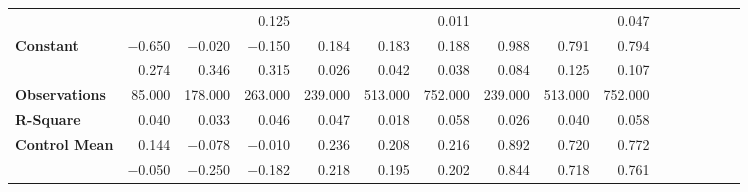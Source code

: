 \begin{tabular}{@{\extracolsep{5pt}}lrrrrrrrrrrrrrrr}
{\bf } & \phantom{***} & \phantom{***} & 0.125\phantom{\phantom{)}***} & \phantom{***} & \phantom{***} & 0.011\phantom{\phantom{)}***} & \phantom{***} & \phantom{***} & 0.047\phantom{\phantom{)}***} \\
{\bf Constant} & $-$0.650\phantom{\phantom{)}***} & $-$0.020\phantom{\phantom{)}***} & $-$0.150\phantom{\phantom{)}***} & 0.184\phantom{\phantom{)}***} & 0.183\phantom{\phantom{)}***} & 0.188\phantom{\phantom{)}***} & 0.988\phantom{\phantom{)}***} & 0.791\phantom{\phantom{)}***} & 0.794\phantom{\phantom{)}***} \\
{\bf } & 0.274\phantom{\phantom{)}***} & 0.346\phantom{\phantom{)}***} & 0.315\phantom{\phantom{)}***} & 0.026\phantom{\phantom{)}***} & 0.042\phantom{\phantom{)}***} & 0.038\phantom{\phantom{)}***} & 0.084\phantom{\phantom{)}***} & 0.125\phantom{\phantom{)}***} & 0.107\phantom{\phantom{)}***} \\
{\bf Observations} & 85.000\phantom{\phantom{)}***} & 178.000\phantom{\phantom{)}***} & 263.000\phantom{\phantom{)}***} & 239.000\phantom{\phantom{)}***} & 513.000\phantom{\phantom{)}***} & 752.000\phantom{\phantom{)}***} & 239.000\phantom{\phantom{)}***} & 513.000\phantom{\phantom{)}***} & 752.000\phantom{\phantom{)}***} \\
{\bf R-Square} & 0.040\phantom{***} & 0.033\phantom{***} & 0.046\phantom{***} & 0.047\phantom{***} & 0.018\phantom{***} & 0.058\phantom{***} & 0.026\phantom{***} & 0.040\phantom{***} & 0.058\phantom{***} \\
{\bf Control Mean} & 0.144\phantom{***} & $-$0.078\phantom{***} & $-$0.010\phantom{***} & 0.236\phantom{***} & 0.208\phantom{***} & 0.216\phantom{***} & 0.892\phantom{***} & 0.720\phantom{***} & 0.772\phantom{***} \\
{\bf } & $-$0.050\phantom{***} & $-$0.250\phantom{***} & $-$0.182\phantom{***} & 0.218\phantom{***} & 0.195\phantom{***} & 0.202\phantom{***} & 0.844\phantom{***} & 0.718\phantom{***} & 0.761\phantom{***} \\
\hline
\end{tabular}
